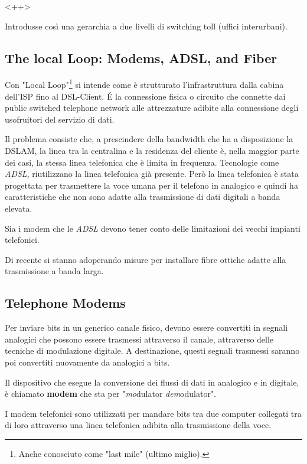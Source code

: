 \documentclass[../ComputerNetworks.tex]{subfiles}
\begin{document}
<++>

Introdusse così una gerarchia a due livelli di switching toll (uffici interurbani).

\subsection{The local Loop: Modems, ADSL, and Fiber}

Con "Local Loop"\footnote{Anche conosciuto come "last mile" (ultimo miglio).} si intende come è strutturato l'infrastruttura dalla cabina dell'ISP fino al DSL-Client.
\'E la connessione fisica o circuito che connette dai public switched telephone network alle attrezzature adibite alla connessione degli usofruitori del servizio di dati.

Il problema consiste che, a prescindere della bandwidth che ha a disposizione la DSLAM, la linea tra la centralina e la residenza del cliente è, nella maggior parte dei casi, la stessa linea telefonica che è limita in frequenza.
Tecnologie come \emph{ADSL}, riutilizzano la linea telefonica già presente.
Però la linea telefonica è stata progettata per trasmettere la voce umana per il telefono in analogico e quindi ha caratteristiche che non sono adatte alla trasmissione di dati digitali a banda elevata.

Sia i modem che le \emph{ADSL} devono tener conto delle limitazioni dei vecchi impianti telefonici.

Di recente si stanno adoperando misure per installare fibre ottiche adatte alla trasmissione a banda larga.

\subsection{Telephone Modems}

Per inviare bits in un generico canale fisico, devono essere convertiti in segnali analogici che possono essere trasmessi attraverso il canale, attraverso delle tecniche di modulazione digitale.
A destinazione, questi segnali trasmessi saranno poi convertiti nuovamente da analogici a bits.

Il dispositivo che esegue la conversione dei flussi di dati in analogico e in digitale, è chiamato \textbf{modem} che sta per "\emph{mo}dulator \emph{dem}odulator".

I modem telefonici sono utilizzati per mandare bits tra due computer collegati tra di loro attraverso una linea telefonica adibita alla trasmissione della voce.
\end{document}
